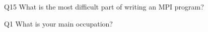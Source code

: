 \begin{description}%
\item{Q15} What is the most difficult part of writing an MPI program?%
\item{Q1} What is your main occupation?%
\end{description}%

